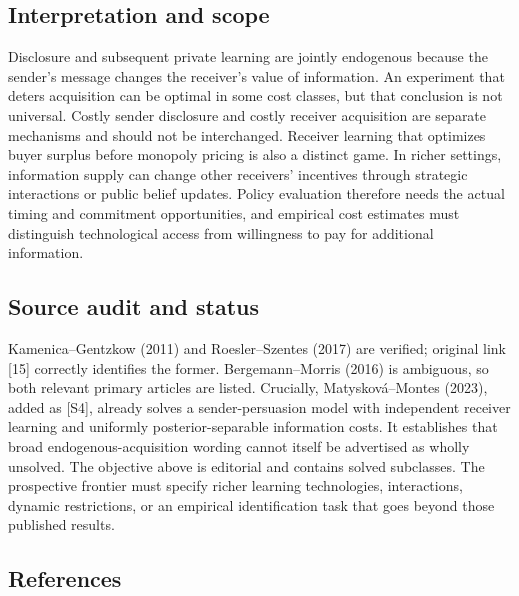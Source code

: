 \documentclass[11pt,a4paper]{article}
\begin{document}
\subsection*{Interpretation and scope}

Disclosure and subsequent private learning are jointly endogenous because the sender's message changes the receiver's value of information. An experiment that deters acquisition can be optimal in some cost classes, but that conclusion is not universal. Costly sender disclosure and costly receiver acquisition are separate mechanisms and should not be interchanged. Receiver learning that optimizes buyer surplus before monopoly pricing is also a distinct game. In richer settings, information supply can change other receivers' incentives through strategic interactions or public belief updates. Policy evaluation therefore needs the actual timing and commitment opportunities, and empirical cost estimates must distinguish technological access from willingness to pay for additional information.

\subsection*{Source audit and status}

Kamenica--Gentzkow (2011) and Roesler--Szentes (2017) are verified; original link [15] correctly identifies the former. Bergemann--Morris (2016) is ambiguous, so both relevant primary articles are listed. Crucially, Matysková--Montes (2023), added as [S4], already solves a sender-persuasion model with independent receiver learning and uniformly posterior-separable information costs. It establishes that broad endogenous-acquisition wording cannot itself be advertised as wholly unsolved. The objective above is editorial and contains solved subclasses. The prospective frontier must specify richer learning technologies, interactions, dynamic restrictions, or an empirical identification task that goes beyond those published results.

\subsection*{References}
\end{document}
